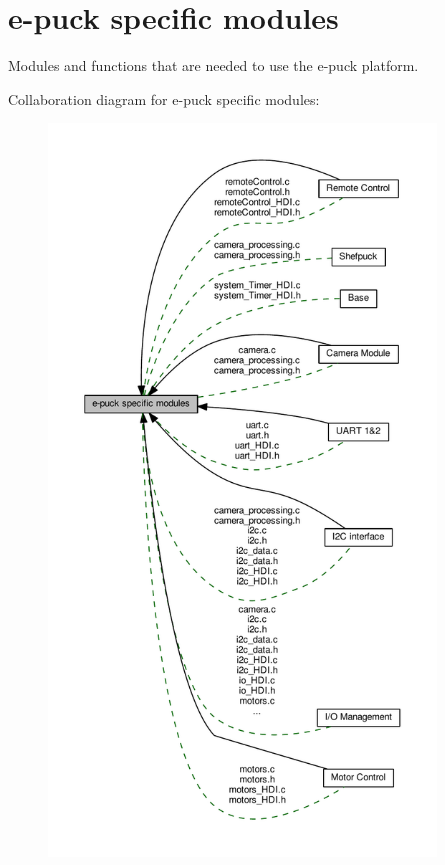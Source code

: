 \hypertarget{group__epuck}{}\section{e-\/puck specific modules}
\label{group__epuck}


Modules and functions that are needed to use the e-\/puck platform.  


Collaboration diagram for e-\/puck specific modules\+:\nopagebreak
\begin{figure}[H]
\begin{center}
\leavevmode
\includegraphics[height=550pt]{d9/dc8/group__epuck}
\end{center}
\end{figure}
